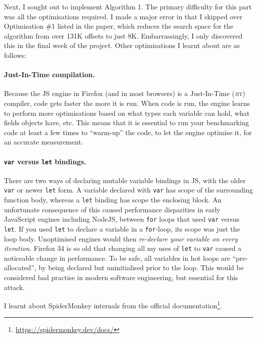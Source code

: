\documentclass[a4paper,10pt,twocolumn]{article}
\theoremstyle{definition}
\newcommand*{\code}{\texttt}
\newcommand*{\acronym}{\textsc}
\begin{document}
Next, I sought out to implement Algorithm 1.
The primary difficulty for this part was all the optimisations required.
I made a major error in that I skipped over Optimisation \#1 listed in the paper,
which reduces the search space for the algorithm from over 131K offsets to just 8K.
Embarrassingly, I only discovered this in the final week of the project.
Other optimisations I learnt about are as follows:


\paragraph{Just-In-Time compilation.}
Because the JS engine in Firefox (and in most browsers) is a
Just-In-Time (\acronym{jit}) compiler, code gets faster the more it is run.
When code is run, the engine learns to perform more optimisations based on
what types each variable can hold, what fields objects have, etc.
This means that it is essential to run your benchmarking code at least a few
times to ``warm-up'' the code, to let the engine optimise it, for an
accurate measurement.

\paragraph{\code{var} versus \code{let} bindings.}
There are two ways of declaring mutable variable bindings in JS, with the
older \code{var} or newer \code{let} form.
A variable declared with \code{var} has scope of the surrounding function body,
whereas a \code{let} binding has scope the enclosing block.
An unfortunate consequence of this caused performance disparities in early
JavaScript engines including NodeJS, between \code{for} loops that used
\code{var} versus \code{let}.
If you used \code{let} to declare a variable in a \code{for}-loop, its scope was
just the loop body.
Unoptimised engines would then \emph{re-declare your variable on every
  iteration}.
Firefox 34 is so old that changing all my uses of \code{let} to \code{var}
caused a noticeable change in performance.
To be safe, all variables in hot loops are ``pre-allocated'', by being declared
but uninitialised prior to the loop.
This would be considered bad practise in modern software engineering, but
essential for this attack.

I learnt about SpiderMonkey internals from the official
documentation\footnote{\url{https://spidermonkey.dev/docs/}}.
\end{document}
